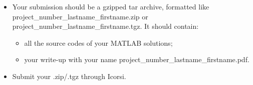 \documentclass[unicode,11pt,a4paper,oneside,numbers=endperiod,openany]{scrartcl}
\begin{document}
\begin{itemize}
	\item Your submission should be a gzipped tar archive, formatted like project\_number\_lastname\_firstname.zip or project\_number\_lastname\_firstname.tgz. 
	It should contain:
	\begin{itemize}
		\item all the source codes of your MATLAB solutions;
		\item your write-up with your name  project\_number\_lastname\_firstname.pdf.
	\end{itemize}
	\item Submit your .zip/.tgz through Icorsi.
\end{itemize}
\end{document}
